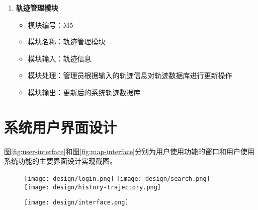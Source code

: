 \begin{enumerate}
	\item \textbf{轨迹管理模块}
	\begin{itemize}
		\item 模块编号：M5
		\item 模块名称：轨迹管理模块
		\item 模块输入：轨迹信息
		\item 模块处理：管理员根据输入的轨迹信息对轨迹数据库进行更新操作
		\item 模块输出：更新后的系统轨迹数据库
	\end{itemize}
\end{enumerate}



\section{系统用户界面设计}
\label{sec:window interface}

图\ref{fig:user-interface}和图\ref{fig:map-interface}分别为用户使用功能的窗口和用户使用系统功能的主要界面设计实现截图。

\begin{figure}[!htp]
	\centering
	\texttt{[image: design/login.png]}
	\hspace{0.3cm}
	\texttt{[image: design/search.png]}
   	\hspace{0.3cm}
   	\texttt{[image: design/history-trajectory.png]}
\end{figure}

\begin{figure}[!htp]
  \centering
  \texttt{[image: design/interface.png]}
\end{figure}



